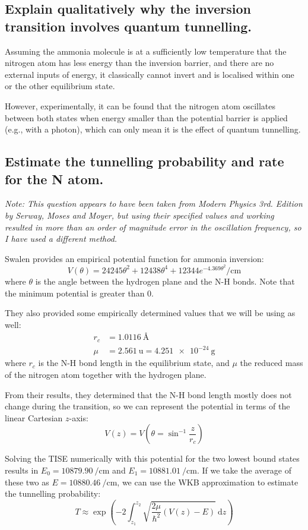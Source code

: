 \documentclass[a4paper]{scrartcl}
\begin{document}
\subsection{Explain qualitatively why the inversion transition involves quantum tunnelling.}
Assuming the ammonia molecule is at a sufficiently low temperature that the nitrogen atom has less energy than the inversion barrier, and there are no external inputs of energy, it classically cannot invert and is localised within one or the other equilibrium state.

However, experimentally, it can be found that the nitrogen atom oscillates between both states when energy smaller than the potential barrier is applied (e.g., with a photon), which can only mean it is the effect of quantum tunnelling.

\subsection{Estimate the tunnelling probability and rate for the N atom.}
\emph{Note: This question appears to have been taken from \emph{Modern Physics 3rd. Edition} by Serway, Moses and Moyer, but using their specified values and working resulted in more than an order of magnitude error in the oscillation frequency, so I have used a different method.}

Swalen \cite{Swalen1962} provides an empirical potential function for ammonia inversion:
\[V(\theta) = 24245 \theta^2 + 12438 \theta^4 + 12344 e^{-4.369 \theta^2} \si{\per\centi\metre}\]
where \(\theta\) is the angle between the hydrogen plane and the N-H bonds. Note that the minimum potential is greater than 0.

They also provided some empirically determined values that we will be using as well:
\begin{align*}
    r_c &= \SI{1.0116}{\angstrom} \\
    \mu &= \SI{2.561}{\amu} = \SI{4.251e-24}{\gram}
\end{align*}
where \(r_c\) is the N-H bond length in the equilibrium state, and \(\mu\) the reduced mass of the nitrogen atom together with the hydrogen plane.

From their results, they determined that the N-H bond length mostly does not change during the transition, so we can represent the potential in terms of the linear Cartesian \(z\)-axis:
\[V(z) = V\left(\theta = \sin^{-1}\frac{z}{r_c}\right)\]

Solving the TISE numerically with this potential for the two lowest bound states results in \(E_0 = \SI{10879.90}{\per\centi\metre}\) and \(E_1 = \SI{10881.01}{\per\centi\metre}\). If we take the average of these two as \(E = \SI{10880.46}{\per\centi\metre}\), we can use the WKB approximation to estimate the tunnelling probability:
\[T \approx \exp\left(-2 \int_{z_1}^{z_2} \sqrt{\frac{2 \mu}{\hbar^2} (V(z) - E)} \:\mathrm{d}z\right)\]
\end{document}
